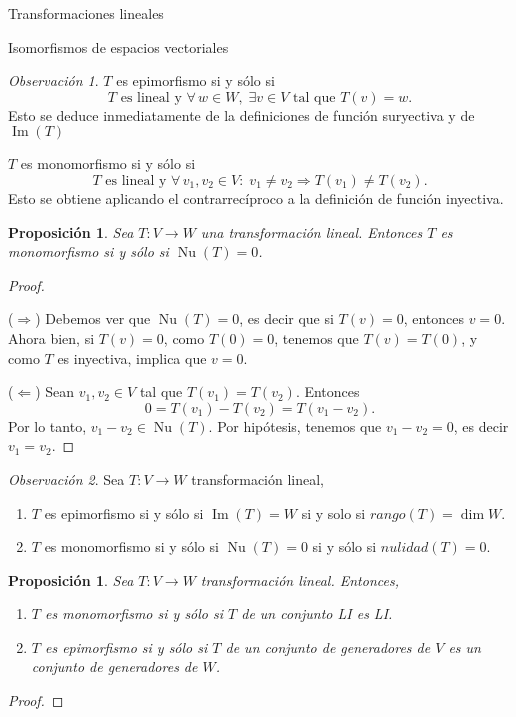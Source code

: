 \documentclass[a4paper,12pt,twoside,spanish]{amsbook}
\newtheorem{proposicion}[teorema]{Proposici\'on}
\theoremstyle{definition}
\theoremstyle{remark}
\newtheorem{obs}{Observaci\'on}[section]
\newcommand{\img}{\operatorname{Im}}
\newcommand{\nuc}{\operatorname{Nu}}
\begin{document}
\begin{chapter}{Transformaciones lineales}
\begin{section}{Isomorfismos de espacios vectoriales}
		\begin{obs}
			$T$  es epimorfismo si y sólo si 
			$$
			\text{$T$ es lineal y }\forall\, w \in W, \; \exists v \in V \text{ tal que }T(v)=w.
			$$
			Esto se deduce inmediatamente de la definiciones de función suryectiva y de $\img(T)$
			
			$T$ es monomorfismo si y sólo si 
			$$
				\text{$T$ es lineal y }\forall\, v_1,v_2  \in V: \; v_1 \ne v_2 \Rightarrow T(v_1) \not= T(v_2).
			$$ 
			Esto se obtiene aplicando el contrarrecíproco a la definición de función inyectiva.
		\end{obs}	
		
		
			
		\begin{proposicion}\label{inyectiva-sii-nuT=0}
			Sea $T:V \to W$ una transformación lineal. Entonces $T$ es monomorfismo si y sólo si $\nuc(T) =0$.
		\end{proposicion}	
		\begin{proof} 
			
			\
			
			($\Rightarrow$) Debemos ver que  $\nuc(T)=0$,  es decir que si $T(v)=0$,  entonces  $v=0$. Ahora bien,  si $T(v) = 0$, como  $T(0)=0$, tenemos que $T(v)  = T(0)$, y como $T$ es inyectiva, implica que $v =0$.
			
			($\Leftarrow$) Sean  $v_1,v_2 \in V$ tal que $T(v_1)=T(v_2)$. Entonces 
			$$
			0 = T(v_1)- T(v_2) = T(v_1 -v_2).
			$$
			Por  lo tanto, $v_1 -v_2 \in \nuc(T)$. Por hipótesis, tenemos que $v_1 -v_2 =0$,  es decir $v_1 = v_2$.
		\end{proof}
		
		
		\begin{obs} Sea $T: V \to W$ transformación lineal, 
			\begin{enumerate}
				\item $T$  es {epimorfismo} si y sólo  si $\img(T) = W$ si  y solo si $rango(T) = \dim W$.
				\item $T$ es {monomorfismo} si y sólo  si $\nuc(T) = 0$ si y sólo si $nulidad(T) =0$.
			\end{enumerate}  
		\end{obs}		
		
		\begin{proposicion}\label{prop-T-mono-sii-li-2-li} Sea $T:V \to W$ transformación lineal. Entonces,
			\begin{enumerate}
				\item $T$ es monomorfismo si y sólo si $T$ de un conjunto LI  es  LI.
				\item $T$ es epimorfismo si y sólo si $T$ de un conjunto de generadores de $V$ es un conjunto de generadores de $W$.
			\end{enumerate}
		\end{proposicion}
		\begin{proof}
			

\end{proof}
\end{section}
\end{chapter}
\end{document}
